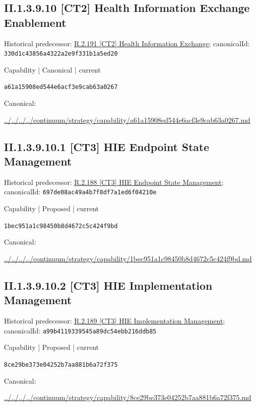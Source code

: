 \documentclass[10pt,a4paper]{article}
\begin{document}
\subsection*{II.1.3.9.10 [CT2] Health Information Exchange Enablement}
Historical predecessor: \hyperref[element-330d1c43856a4322a2e9f331b1a5ed20]{R.2.191 [CT2] Health Information Exchange}; canonicalId: \texttt{330d1c43856a4322a2e9f331b1a5ed20}\par
\label{element-a61a15908ed544e6acf3e9cab63a0267}
{\small Capability | Canonical | current}\par
\texttt{a61a15908ed544e6acf3e9cab63a0267}\par
Canonical: \par
{\footnotesize\url{../../../../continuum/strategy/capability/a61a15908ed544e6acf3e9cab63a0267.md}}\par
\subsection*{II.1.3.9.10.1 [CT3] HIE Endpoint State Management}
Historical predecessor: \hyperref[element-697de08ac49a4b7f8df7a1ed6f04210e]{R.2.188 [CT3] HIE Endpoint State Management}; canonicalId: \texttt{697de08ac49a4b7f8df7a1ed6f04210e}\par
\label{element-1bec951a1c98450b8d4672c5c424f9bd}
{\small Capability | Proposed | current}\par
\texttt{1bec951a1c98450b8d4672c5c424f9bd}\par
Canonical: \par
{\footnotesize\url{../../../../continuum/strategy/capability/1bec951a1c98450b8d4672c5c424f9bd.md}}\par
\subsection*{II.1.3.9.10.2 [CT3] HIE Implementation Management}
Historical predecessor: \hyperref[element-a99b4119339545a89dc54ebb216ddb85]{R.2.189 [CT3] HIE Implementation Management}; canonicalId: \texttt{a99b4119339545a89dc54ebb216ddb85}\par
\label{element-8ce29be373e04252b7aa881b6a72f375}
{\small Capability | Proposed | current}\par
\texttt{8ce29be373e04252b7aa881b6a72f375}\par
Canonical: \par
{\footnotesize\url{../../../../continuum/strategy/capability/8ce29be373e04252b7aa881b6a72f375.md}}\par
\end{document}
